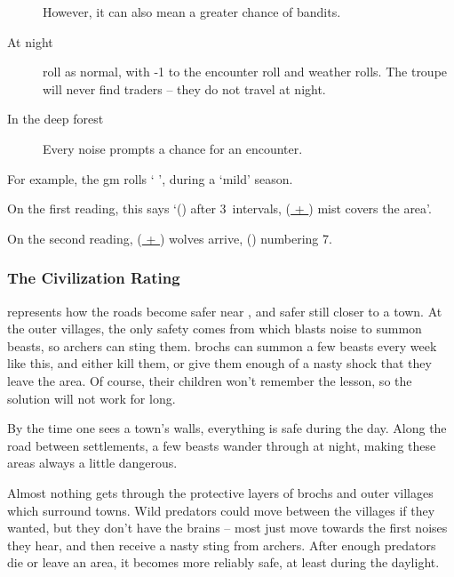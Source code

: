 \begin{multicols}{2}
\begin{description}
  However, it can also mean a greater chance of bandits.

  \item[At night]
  roll as normal, with -1 to the encounter roll and weather rolls.
  The troupe will never find traders -- they do not travel at night.
  \item[In the deep forest]
  Every noise prompts a chance for an encounter.
\end{description}

\end{multicols}

\pagebreak

\begin{multicols}{2}

\begin{exampletext}
  For example, the \gls{gm} rolls `  ', during a `mild' season.

  On the first reading, this says `() after 3~\glspl{interval}, (\underline{ + }) mist covers the area'.

  On the second reading, (\underline{ + }) wolves arrive, () numbering 7.


\end{exampletext}

\subsubsection{The Civilization Rating}
\label{civilizationRating}
represents how the roads become safer near , and safer still closer to a town.
At the outer \glspl{village}, the only safety comes from  which blasts noise to summon beasts, so archers can sting them.
\Glspl{broch} can summon a few beasts every week like this, and either kill them, or give them enough of a nasty shock that they leave the area.
Of course, their children won't remember the lesson, so the solution will not work for long.

By the time one sees a town's walls, everything is safe during the day.
Along the road between settlements, a few beasts wander through at night, making these areas always a little dangerous.

Almost nothing gets through the protective layers of \glspl{broch} and outer \glspl{village} which surround towns.
Wild predators could move between the \glspl{village} if they wanted, but they don't have the brains -- most just move towards the first noises they hear, and then receive a nasty sting from archers.
After enough predators die or leave an area, it becomes more reliably safe, at least during the daylight.


\end{multicols}
